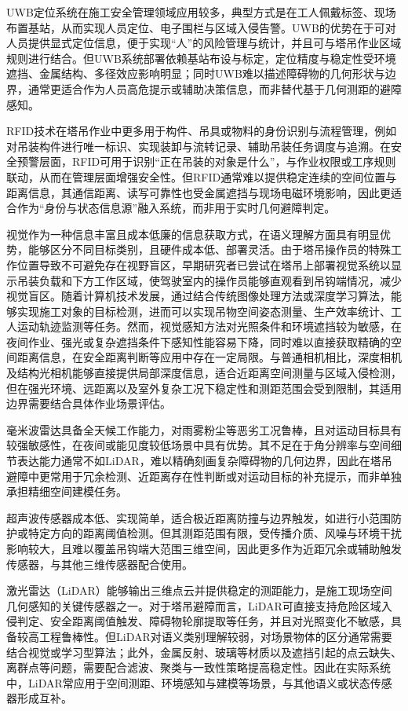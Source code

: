 UWB定位系统在施工安全管理领域应用较多，典型方式是在工人佩戴标签、现场布置基站，从而实现人员定位、电子围栏与区域入侵告警。UWB的优势在于可对人员提供显式定位信息，便于实现“人”的风险管理与统计，并且可与塔吊作业区域规则进行结合。但UWB系统部署依赖基站布设与标定，定位精度与稳定性受环境遮挡、金属结构、多径效应影响明显；同时UWB难以描述障碍物的几何形状与边界，通常更适合作为人员高危提示或辅助决策信息，而非替代基于几何测距的避障感知。

RFID技术在塔吊作业中更多用于构件、吊具或物料的身份识别与流程管理，例如对吊装构件进行唯一标识、实现装卸与流转记录、辅助吊装任务调度与追溯。在安全预警层面，RFID可用于识别“正在吊装的对象是什么”，与作业权限或工序规则联动，从而在管理层面增强安全性。但RFID通常难以提供稳定连续的空间位置与距离信息，其通信距离、读写可靠性也受金属遮挡与现场电磁环境影响，因此更适合作为“身份与状态信息源”融入系统，而非用于实时几何避障判定。

视觉作为一种信息丰富且成本低廉的信息获取方式，在语义理解方面具有明显优势，能够区分不同目标类别，且硬件成本低、部署灵活。由于塔吊操作员的特殊工作位置导致不可避免存在视野盲区，早期研究者已尝试在塔吊上部署视觉系统\cite{KC3A3Q33}以显示吊装负载和下方工作区域，使驾驶室内的操作员能够直观看到吊钩端情况，减少视觉盲区。随着计算机技术发展，通过结合传统图像处理方法或深度学习算法，能够实现施工对象的目标检测，进而可以实现吊物空间姿态测量\cite{U6D69PTF}、生产效率统计\cite{MIA77CU2}、工人运动轨迹监测\cite{G47UYPFK}等任务。然而，视觉感知方法对光照条件和环境遮挡较为敏感，在夜间作业、强光或复杂遮挡条件下感知性能容易下降，同时难以直接获取精确的空间距离信息，在安全距离判断等应用中存在一定局限。与普通相机相比，深度相机及结构光相机能够直接提供局部深度信息，适合近距离空间测量与区域入侵检测，但在强光环境、远距离以及室外复杂工况下稳定性和测距范围会受到限制，其适用边界需要结合具体作业场景评估。

毫米波雷达具备全天候工作能力，对雨雾粉尘等恶劣工况鲁棒，且对运动目标具有较强敏感性，在夜间或能见度较低场景中具有优势。其不足在于角分辨率与空间细节表达能力通常不如LiDAR，难以精确刻画复杂障碍物的几何边界，因此在塔吊避障中更常用于冗余检测、近距离存在性判断或对运动目标的补充提示，而非单独承担精细空间建模任务。

超声波传感器成本低、实现简单，适合极近距离防撞与边界触发，如进行小范围防护或特定方向的距离阈值检测。但其测距范围有限，受传播介质、风噪与环境干扰影响较大，且难以覆盖吊钩端大范围三维空间，因此更多作为近距冗余或辅助触发传感器，与其他三维传感器配合使用。

激光雷达（LiDAR）能够输出三维点云并提供稳定的测距能力，是施工现场空间几何感知的关键传感器之一。对于塔吊避障而言，LiDAR可直接支持危险区域入侵判定、安全距离阈值触发、障碍物轮廓提取等任务，并且对光照变化不敏感，具备较高工程鲁棒性。但LiDAR对语义类别理解较弱，对场景物体的区分通常需要结合视觉或学习型算法；此外，金属反射、玻璃等材质以及遮挡引起的点云缺失、离群点等问题，需要配合滤波、聚类与一致性策略提高稳定性。因此在实际系统中，LiDAR常应用于空间测距、环境感知与建模等场景，与其他语义或状态传感器形成互补\cite{3}。

